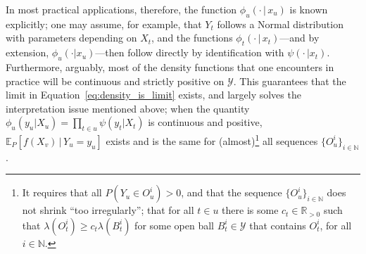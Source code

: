 \documentclass[twoside,11pt]{article}
\newcommand{\nats}{\mathbb{N}}
\newcommand{\reals}{\mathbb{R}}
\newcommand{\realspos}{\reals_{>0}}
\newcommand{\states}{\mathcal{X}}
\newcommand{\observs}{\mathcal{Y}}
\begin{document}
In most practical applications, therefore, the function $\phi_u(\cdot\,\vert\,x_u)$ is known explicitly; one may assume, for example, that $Y_t$ follows a Normal distribution with parameters depending on $X_t$, and the functions $\phi_t(\cdot\,\vert\,x_t)$---and by extension, $\phi_u(\cdot\vert x_u)$---then follow directly by identification with $\psi(\cdot\,\vert x_t)$. Furthermore, arguably, most of the density functions that one encounters in practice will be continuous and strictly positive on $\observs$. This guarantees that the limit in Equation~\eqref{eq:density_is_limit} exists, and largely solves the interpretation issue mentioned above; when the quantity $\phi_u(y_u\vert X_u)=\prod_{t\in u}\psi(y_t\vert X_t)$ is continuous and positive, $\mathbb{E}_P[f(X_v)\,\vert\,Y_u=y_u]$ exists and is the same for (almost)\footnote{\label{fnote:limit_required_properties}It requires that all $P(Y_u\in O_u^i)>0$, and that the sequence $\{O_u^i\}_{i\in\nats}$ does not shrink ``too irregularly''; that for all $t\in u$ there is some $c_t\in\realspos$ such that $\lambda(O_t^i)\geq c_t\lambda(B_t^i)$ for some open ball $B_t^i\in\observs$ that contains $O_t^i$, for all $i\in\nats$.} all sequences $\{O_u^i\}_{i\in\nats}$. 

\end{document}
